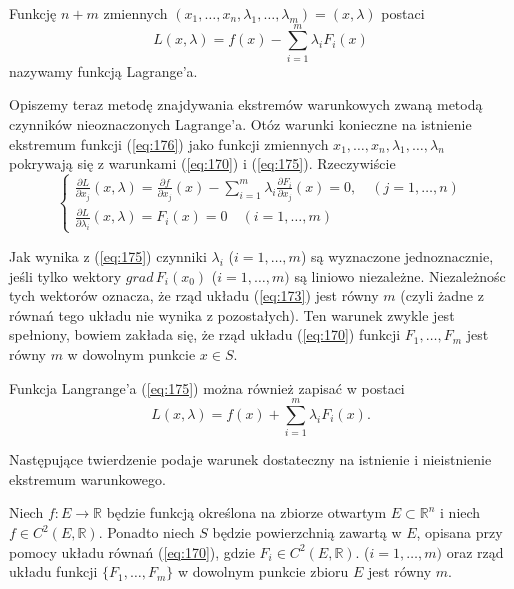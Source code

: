\documentclass[leqno]{article}
\begin{document}
\begin{justify}
\begin{defn}
    Funkcję $n + m$ zmiennych $(x_1, \ldots, x_n, \lambda_1, \ldots, \lambda_m) = (x, \lambda)$ postaci
    \begin{equation}\label{eq:176}
        L(x, \lambda) = f(x) - \sum_{i=1}^{m}\lambda_i F_i(x)
    \end{equation}
    nazywamy funkcją Lagrange'a.
\end{defn}

Opiszemy teraz metodę znajdywania ekstremów warunkowych zwaną metodą czynników nieoznaczonych Lagrange'a. Otóz warunki konieczne na istnienie ekstremum funkcji
(\ref{eq:176}) jako funkcji zmiennych $x_1, \ldots, x_n, \lambda_1, \ldots, \lambda_n$ pokrywają się z warunkami (\ref{eq:170}) i (\ref{eq:175}). Rzeczywiście 
\[
    \begin{cases}
        \frac{\partial L}{\partial x_j}(x, \lambda) = \frac{\partial f}{\partial x_j}(x) - \sum_{i=1}^{m}\lambda_i \frac{\partial F_i}{\partial x_j}(x) = 0, \quad (j = 1, \ldots, n) \\
        \frac{\partial L}{\partial \lambda_i}(x, \lambda) = F_i(x) = 0 \quad (i = 1, \ldots, m)
    \end{cases}
\]

Jak wynika z (\ref{eq:175}) czynniki $\lambda_i$ ($ i = 1, \ldots, m$) są wyznaczone jednoznacznie, jeśli tylko wektory $ grad \, F_i(x_0)$ ($i = 1, \ldots, m)$ są liniowo niezależne.
Niezależnośc tych wektorów oznacza, że rząd układu (\ref{eq:173}) jest równy $m$ (czyli żadne z równań tego układu nie wynika z pozostałych).
Ten warunek zwykle jest spełniony, bowiem zakłada się, że rząd układu (\ref{eq:170}) funkcji $F_1, \ldots, F_m$ jest równy $m$ w dowolnym punkcie $x \in S$. 

Funkcja Langrange'a (\ref{eq:175}) można również zapisać w postaci 
\[
    L(x, \lambda) = f(x) + \sum_{i=1}^{m}\lambda_i F_i(x).
\]

Następujące twierdzenie podaje warunek dostateczny na istnienie i nieistnienie ekstremum warunkowego.

\begin{theorem}
    Niech $f : E \to \mathbb{R}$ będzie funkcją określona na zbiorze otwartym $E \subset \mathbb{R}^n$ i niech $f \in C^2(E, \mathbb{R})$.
    Ponadto niech $S$ będzie powierzchnią zawartą w $E$, opisana przy pomocy układu równań (\ref{eq:170}), gdzie $F_i \in C^2(E, \mathbb{R})$. ($i = 1, \ldots, m)$ oraz
    rząd układu funkcji $\{F_1, \ldots, F_m\}$ w dowolnym punkcie zbioru $E$ jest równy $m$.
    

\end{theorem}
\end{justify}
\end{document}

